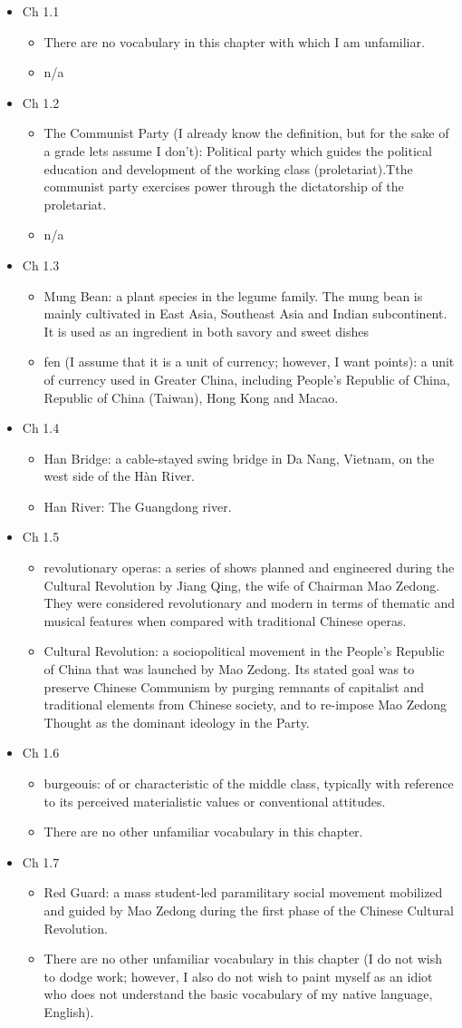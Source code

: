 \documentclass[12pt]{article}
\newcommand{\vc}[4]{
  \item Ch #1.#2
  \begin{itemize}
    \item #3
    \item #4
  \end{itemize}
}
\begin{document}
\vspace{2em}
\begin{itemize}

  \vc{1}{1}{There are no vocabulary in this chapter with which I am unfamiliar.}{n/a}

  \vc{1}{2}{The Communist Party (I already know the definition, but for the sake of a grade lets assume I don't): Political party which guides the political education and development of the working class (proletariat).Tthe communist party exercises power through the dictatorship of the proletariat.}{n/a}

  \vc{1}{3}{Mung Bean: a plant species in the legume family. The mung bean is mainly cultivated in East Asia, Southeast Asia and Indian subcontinent. It is used as an ingredient in both savory and sweet dishes}{fen (I assume that it is a unit of currency; however, I want points): a unit of currency used in Greater China, including People's Republic of China, Republic of China (Taiwan), Hong Kong and Macao.}

  \vc{1}{4}{Han Bridge: a cable-stayed swing bridge in Da Nang, Vietnam, on the west side of the Hàn River.}{Han River: The Guangdong river.}

  \vc{1}{5}{revolutionary operas: a series of shows planned and engineered during the Cultural Revolution by Jiang Qing, the wife of Chairman Mao Zedong. They were considered revolutionary and modern in terms of thematic and musical features when compared with traditional Chinese operas.}{Cultural Revolution: a sociopolitical movement in the People's Republic of China that was launched by Mao Zedong. Its stated goal was to preserve Chinese Communism by purging remnants of capitalist and traditional elements from Chinese society, and to re-impose Mao Zedong Thought as the dominant ideology in the Party.}

  \vc{1}{6}{burgeouis: of or characteristic of the middle class, typically with reference to its perceived materialistic values or conventional attitudes.}{There are no other unfamiliar vocabulary in this chapter.}

  \vc{1}{7}{Red Guard: a mass student-led paramilitary social movement mobilized and guided by Mao Zedong during the first phase of the Chinese Cultural Revolution.}{There are no other unfamiliar vocabulary in this chapter (I do not wish to dodge work; however, I also do not wish to paint myself as an idiot who does not understand the basic vocabulary of my native language, English).}


\end{itemize}
\end{document}
